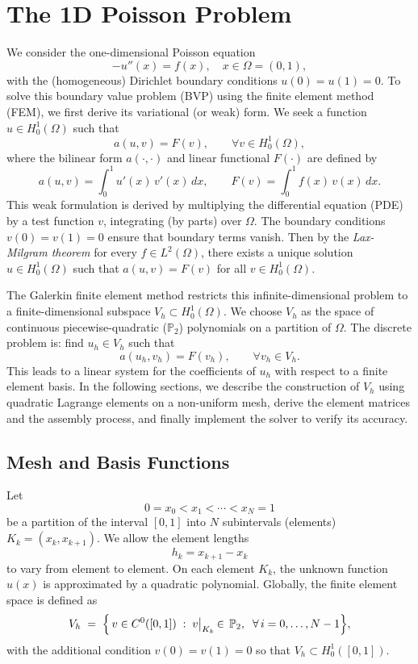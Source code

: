 \documentclass[a4paper,10pt]{article}
\begin{document}

\clearpage

\section{The 1D Poisson Problem}
We consider the one-dimensional Poisson equation
\[
	-u''(x) = f(x), \quad x \in \Omega=(0,1),
\]
with the (homogeneous) Dirichlet boundary conditions \(u(0)=u(1)=0\).
To solve this boundary value problem (BVP) using the finite element method (FEM), we first derive its variational (or weak) form.
We seek a function \(u \in H^1_0(\Omega)\) such that
\[
	a(u,v) = F(v), \qquad \forall v \in H^1_0(\Omega),
\]
where the bilinear form \(a(\cdot,\cdot)\) and linear functional \(F(\cdot)\) are defined by
\[
	a(u,v) = \int_0^1 u'(x)\,v'(x)\,dx, \qquad F(v) = \int_0^1 f(x)\,v(x)\,dx. \label{eq:weak_form}
\]
This weak formulation is derived by multiplying the differential equation (PDE) by a test function \(v\), integrating (by parts) over \(\Omega\).
The boundary conditions \(v(0)=v(1)=0\) ensure that boundary terms vanish. Then by the \emph{Lax-Milgram theorem} for every \(f \in L^2(\Omega)\), there exists a unique solution \(u \in H^1_0(\Omega)\) such that \(a(u,v)=F(v)\) for all \(v \in H^1_0(\Omega)\)\cite{lax_milgram_1954}.

The Galerkin finite element method restricts this infinite-dimensional problem to a finite-dimensional subspace \(V_h \subset H^1_0(\Omega)\). We choose \(V_h\) as the space of continuous piecewise-quadratic (\(\mathbb{P}_2\)) polynomials on a partition of \(\Omega\). The discrete problem is: find \(u_h \in V_h\) such that
\[
	a(u_h,v_h) = F(v_h), \qquad \forall v_h \in V_h.
\]
This leads to a linear system for the coefficients of \(u_h\) with respect to a finite element basis.
In the following sections, we describe the construction of \(V_h\) using quadratic Lagrange elements on a non-uniform mesh, derive the element matrices and the assembly process, and finally implement the solver to verify its accuracy.

\subsection{Mesh and Basis Functions}
Let
\[
	0 = x_0 < x_1 < \cdots < x_N = 1
\]
be a partition of the interval $[0,1]$ into $N$ subintervals (elements) $K_k = (x_k, x_{k+1})$. We allow the element lengths
\[
	h_k = x_{k+1} - x_k
\]
to vary from element to element. On each element $K_k$, the unknown function $u(x)$ is approximated by a quadratic polynomial. Globally, the finite element space is defined as
\[
	V_h \;=\; \Bigl\{\,v \in C^{0}([0,1])\;:\; v\bigl|_{K_k} \,\in\, \mathbb{P}_2,\;\; \forall\, i=0,\dots,N-1 \Bigr\},
\]
with the additional condition \(v(0)=v(1)=0\) so that \(V_h \subset H^1_0([0,1])\).
\end{document}
